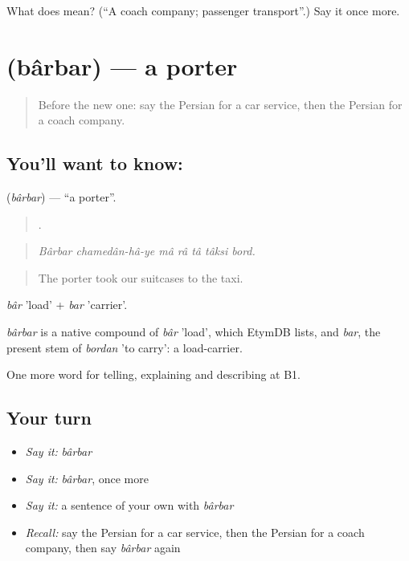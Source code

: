 \begin{tcolorbox}[breakable,colback=teal!4,colframe=teal!35!black,title={Before you move on}]
What does  mean? (\textquotedblleft{}A coach company; passenger transport\textquotedblright{}.) Say it once more.
\end{tcolorbox}
\section[\texorpdfstring{\fa{باربر} (bârbar)}{باربر (bârbar)}]{ (bârbar) — a porter}

\label{lesson:FA-C435-barbar}



\begin{quote}
Before the new one: say the Persian for a car service, then the Persian for a coach company.
\end{quote}

\subsection*{You'll want to know: }
\textbf{} (\emph{bârbar}) — \textquotedblleft{}a porter\textquotedblright{}.

\begin{quote}
      .
\end{quote}

\begin{quote}
\emph{Bârbar chamedân-hâ-ye mâ râ tâ tâksi bord.}
\end{quote}

\begin{quote}
The porter took our suitcases to the taxi.
\end{quote}

\emph{bâr} 'load' + \emph{bar} 'carrier'.

\begin{cousinweb}
\emph{bârbar} is a native compound of \emph{bâr} 'load', which EtymDB lists, and \emph{bar}, the present stem of \emph{bordan} 'to carry': a load-carrier.
\end{cousinweb}

\begin{grammarlens}[title={What you've built}]
One more word for telling, explaining and describing at B1.
\end{grammarlens}

\subsection*{Your turn}
\begin{itemize}
\raggedright
  \item \emph{Say it:} \emph{bârbar}
  \item \emph{Say it:} \emph{bârbar}, once more
  \item \emph{Say it:} a sentence of your own with \emph{bârbar}
  \item \emph{Recall:} say the Persian for a car service, then the Persian for a coach company, then say \emph{bârbar} again
\end{itemize}

